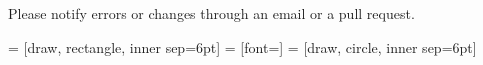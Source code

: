 \documentclass[10pt,a4paper,oneside,openright]{book}
\begin{document}

Please notify errors or changes through an email or a pull request.

\newpage


\tableofcontents



\AtEndDocument{\cleardoublepage}


\mainmatter
\pagestyle{fancy} %


      = [draw, rectangle, inner sep=6pt]
 = [font=\small]
        = [draw, circle, inner sep=6pt]

\end{document}
